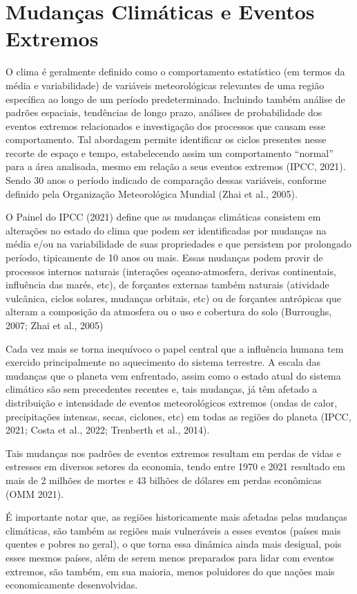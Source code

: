 \documentclass[12pt,a4paper,oneside]{book}
\begin{document}
\section{Mudanças Climáticas e Eventos Extremos}

O clima é geralmente definido como o comportamento estatístico (em termos da média e variabilidade) de variáveis meteorológicas relevantes de uma região específica ao longo de um período predeterminado. Incluindo também análise de padrões espaciais, tendências de longo prazo, análises de probabilidade dos eventos extremos relacionados e investigação dos processos que causam esse comportamento. Tal abordagem permite identificar os ciclos presentes nesse recorte de espaço e tempo, estabelecendo assim um comportamento ``normal'' para a área analisada, mesmo em relação a seus eventos extremos (IPCC, 2021). Sendo 30 anos o período indicado de comparação dessas variáveis, conforme definido pela Organização Meteorológica Mundial (Zhai et al., 2005).

O Painel do IPCC (2021) define que as mudanças climáticas consistem em alterações no estado do clima que podem ser identificadas por mudanças na média e/ou na variabilidade de suas propriedades e que persistem por prolongado período, tipicamente de 10 anos ou mais. Essas mudanças podem provir de processos internos naturais (interações oçeano-atmosfera, derivas continentais, influência das marés, etc), de forçantes externas também naturais (atividade vulcânica, ciclos solares, mudanças orbitais, etc) ou de forçantes antrópicas que alteram a composição da atmosfera ou o uso e cobertura do solo (Burroughs, 2007; Zhai et al., 2005)

Cada vez mais se torna inequívoco o papel central que a influência humana tem exercido principalmente no aquecimento do sistema terrestre. A escala das mudanças que o planeta vem enfrentado, assim como o estado atual do sistema climático são sem precedentes recentes e, tais mudanças, já têm afetado a distribuição e intensidade de eventos meteorológicos extremos (ondas de calor, precipitações intensas, secas, ciclones, etc) em todas as regiões do planeta (IPCC, 2021; Costa et al., 2022; Trenberth et al., 2014).

Tais mudanças nos padrões de eventos extremos resultam em perdas de vidas e estresses em diversos setores da economia, tendo entre 1970 e 2021 resultado em mais de 2 milhões de mortes e 43 bilhões de dólares em perdas econômicas (OMM 2021).

É importante notar que, as regiões historicamente mais afetadas pelas mudanças climáticas, são também as regiões mais vulneráveis a esses eventos (países mais quentes e pobres no geral), o que torna essa dinâmica ainda mais desigual, pois esses mesmos países, além de serem menos preparados para lidar com eventos extremos, são também, em sua maioria, menos poluidores do que nações mais economicamente desenvolvidas.
\end{document}
